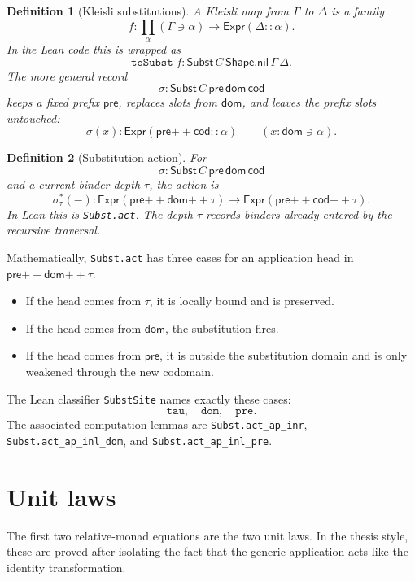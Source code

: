 \documentclass[11pt]{article}
\newtheorem{definition}{Definition}
\newcommand{\Code}[1]{\texttt{#1}}
\newcommand{\Shape}{\mathsf{Shape}}
\newcommand{\Expr}{\mathsf{Expr}}
\newcommand{\Subst}{\mathsf{Subst}}
\newcommand{\nil}{\mathsf{nil}}
\newcommand{\pre}{\mathsf{pre}}
\newcommand{\dom}{\mathsf{dom}}
\newcommand{\cod}{\mathsf{cod}}
\newcommand{\Act}[3]{#1^{\ast}_{#2}(#3)}
\newcommand{\comp}{\mathbin{+\!\!+}}
\newcommand{\cons}{\mathbin{::}}
\begin{document}
\begin{definition}[Kleisli substitutions]
A Kleisli map from \(\Gamma\) to \(\Delta\) is a family
\[
  f : \prod_{\alpha}(\Gamma \ni \alpha) \to \Expr(\Delta \cons \alpha).
\]
In the Lean code this is wrapped as
\[
  \Code{toSubst}\;f : \Subst\,C\,\Shape.\nil\,\Gamma\,\Delta.
\]
The more general record
\[
  \sigma : \Subst\,C\,\pre\,\dom\,\cod
\]
keeps a fixed prefix \(\pre\), replaces slots from \(\dom\), and leaves the
prefix slots untouched:
\[
  \sigma(x) : \Expr(\pre \comp \cod \cons \alpha)
  \qquad(x : \dom \ni \alpha).
\]
\end{definition}

\begin{definition}[Substitution action]
For
\[
  \sigma : \Subst\,C\,\pre\,\dom\,\cod
\]
and a current binder depth \(\tau\), the action is
\[
  \Act{\sigma}{\tau}{-} :
  \Expr(\pre \comp \dom \comp \tau)
    \to
  \Expr(\pre \comp \cod \comp \tau).
\]
In Lean this is \Code{Subst.act}.  The depth \(\tau\) records binders already
entered by the recursive traversal.
\end{definition}

Mathematically, \Code{Subst.act} has three cases for an application head in
\(\pre \comp \dom \comp \tau\).

\begin{itemize}
\item If the head comes from \(\tau\), it is locally bound and is preserved.
\item If the head comes from \(\dom\), the substitution fires.
\item If the head comes from \(\pre\), it is outside the substitution domain
  and is only weakened through the new codomain.
\end{itemize}

The Lean classifier \Code{SubstSite} names exactly these cases:
\[
  \Code{tau},\quad \Code{dom},\quad \Code{pre}.
\]
The associated computation lemmas are
\Code{Subst.act\_ap\_inr}, \Code{Subst.act\_ap\_inl\_dom}, and
\Code{Subst.act\_ap\_inl\_pre}.

\section{Unit laws}

The first two relative-monad equations are the two unit laws.  In the thesis
style, these are proved after isolating the fact that the generic application
acts like the identity transformation.
\end{document}
